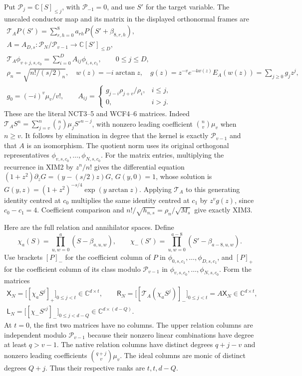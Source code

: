 Put $\mathcal P_j=\mathbb C[S]_{\le j}$, with $\mathcal P_{-1}=0$,
and use $S'$ for the target variable. The unscaled conductor map and its
matrix in the displayed orthonormal frames are
\[
\begin{gathered}
 \mathcal T_AP(S')=\sum_{r,h=0}^{8}a_{rh}P(S'+\beta_{8,r,h}),\\
 A=A_{D,s}:\mathcal P_N/\mathcal P_{v-1}\longrightarrow
             \mathbb C[S']_{\le D},\\
 \mathcal T_A\phi_{v+j,s,c_0}
     =\sum_{i=0}^D A_{ij}\phi_{i,s,c_1},\qquad 0\le j\le D,\\
 \rho_n=\sqrt{n!/(s/2)_n},\quad
 w(z)=-i\arctan z,\quad
 g(z)=z^{-v}e^{-4w(z)}E_A(w(z))=\sum_{j\ge0}g_jz^j,\\
 g_0=(-i)^v\mu_v/v!,\qquad
 A_{ij}=\begin{cases}g_{j-i}\rho_{j+v}/\rho_i,&i\le j,\\
                         0,&i>j.
          \end{cases}
\end{gathered}\tag{XIM3}
\]
These are the literal NCT3--5 and WCF4--6 matrices. Indeed
$\mathcal T_AS^n=\sum_{j=v}^n\binom nj\mu_jS'^{n-j}$, with
nonzero leading coefficient $\binom nv\mu_v$ when $n\ge v$.
It follows by elimination in degree that the kernel is exactly
$\mathcal P_{v-1}$ and that $A$ is an isomorphism. The quotient
norm uses its original orthogonal representatives
$\phi_{v,s,c_0},\ldots,\phi_{N,s,c_0}$.
For the matrix entries, multiplying the recurrence in XIM2 by
$z^n/n!$ gives the differential equation
$(1+z^2)\partial_zG=(y-(s/2)z)G$, $G(y,0)=1$, whose solution is
$G(y,z)=(1+z^2)^{-s/4}\exp(y\arctan z)$.
Applying $\mathcal T_A$ to this generating identity centred at $c_0$
multiplies the same identity centred at $c_1$ by $z^vg(z)$, since
$c_0-c_1=4$. Coefficient comparison and
$n!/\sqrt{h_{n,s}}=\rho_n/\sqrt{M_s}$ give exactly XIM3.

Here are the full relation and annihilator spaces. Define
\[
 \chi_a(S)=\prod_{u,w=0}^{a}(S-\beta_{a,u,w}),\qquad
 \chi_-(S')=\prod_{u,w=0}^{a-8}(S'-\beta_{a-8,u,w}).
 \tag{XIM4}
\]
Use brackets $[P]_-$ for the coefficient column of $P$ in
$\phi_{0,s,c_1},\ldots,\phi_{D,s,c_1}$, and $[P]_+$ for the
coefficient column of its class modulo $\mathcal P_{v-1}$ in
$\phi_{v,s,c_0},\ldots,\phi_{N,s,c_0}$. Form the matrices
\[
\begin{gathered}
 \mathsf X_N=\bigl[[\chi_aS^j]_+\bigr]_{0\le j<t}
       \in\mathbb C^{d\times t},\qquad
 \mathsf R_N=\bigl[[\mathcal T_A(\chi_aS^j)]_-\bigr]_{0\le j<t}
       =A\mathsf X_N\in\mathbb C^{d\times t},\\
 \mathsf L_N=\bigl[[\chi_-S'^j]_-\bigr]_{0\le j<d-Q}
       \in\mathbb C^{d\times(d-Q)}.
\end{gathered}\tag{XIM5}
\]
At $t=0$, the first two matrices have no columns. The upper relation
columns are independent modulo $\mathcal P_{v-1}$ because their
nonzero linear combinations have degree at least $q>v-1$. The
native relation columns have distinct degrees $q+j-v$ and nonzero
leading coefficients $\binom{q+j}{v}\mu_v$. The ideal columns are
monic of distinct degrees $Q+j$. Thus their respective ranks are
$t,t,d-Q$.

